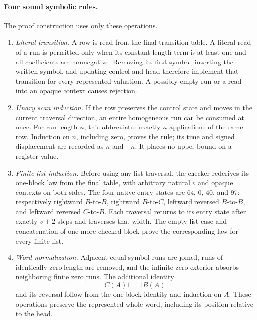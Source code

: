 \paragraph{Four sound symbolic rules.}
The proof construction uses only these operations.
\begin{enumerate}
\item \emph{Literal transition.} A row is read from the final transition
table. A literal read of a run is permitted only when its constant length
term is at least one and all coefficients are nonnegative. Removing its
first symbol, inserting the written symbol, and updating control and head
therefore implement that transition for every represented valuation. A
possibly empty run or a read into an opaque context causes rejection.

\item \emph{Unary scan induction.} If the row preserves the control state
and moves in the current traversal direction, an entire homogeneous run
can be consumed at once. For run length $n$, this abbreviates exactly $n$
applications of the same row. Induction on $n$, including zero, proves the
rule; its time and signed displacement are recorded as $n$ and $\pm n$.
It places no upper bound on a register value.

\item \emph{Finite-list induction.} Before using any list traversal, the
checker rederives its one-block law from the final table, with arbitrary
natural $v$ and opaque contexts on both sides. The four native entry states
are 64, 0, 40, and 97: respectively rightward $B$-to-$B$, rightward
$B$-to-$C$, leftward reversed $B$-to-$B$, and leftward reversed
$C$-to-$B$. Each traversal returns to its entry state after exactly $v+2$
steps and traverses that width. The empty-list case and concatenation of
one more checked block prove the corresponding law for every finite list.

\item \emph{Word normalization.} Adjacent equal-symbol runs are joined,
runs of identically zero length are removed, and the infinite zero exterior absorbs
neighboring finite zero runs. The additional identity
\[
 C(A)1=1B(A)
\]
and its reversal follow from the one-block identity and induction on $A$.
These operations preserve the represented whole word, including its
position relative to the head.
\end{enumerate}

